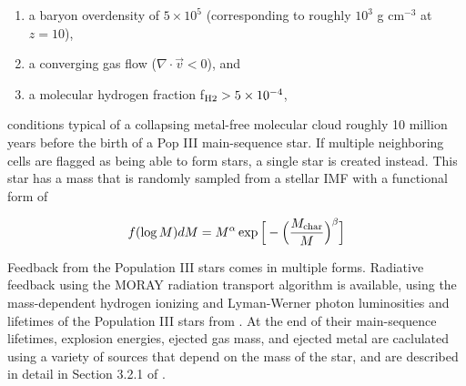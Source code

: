 \begin{enumerate}
\item a baryon overdensity of $5 \times 10^5$ (corresponding to
  roughly $10^3$ g cm$^{-3}$ at $z=10$),

\item a converging gas flow ($\nabla \cdot \vec{v} < 0$), and

\item a molecular hydrogen fraction f$_{\rm H2} > 5 \times 10^{-4}$,
\end{enumerate}

conditions typical of a collapsing metal-free molecular cloud roughly
10 million years before the birth of a Pop III main-sequence star.  If
multiple neighboring cells are flagged as being able to form stars, a
single star is created instead.  This star has a mass that is randomly
sampled from a stellar IMF with a functional form of

\begin{equation}
f(\log M) dM = M^{\alpha} \exp \Big[ -\Big( \frac{M_{\rm char}}{M}
\Big)^{\beta} \Big]
\end{equation}

Feedback from the Population III stars comes in multiple forms.
Radiative feedback using the MORAY radiation transport algorithm
\citep{Wise11_Moray} is available, using the mass-dependent hydrogen
ionizing and Lyman-Werner photon luminosities and lifetimes of the
Population III stars from \citet{2002A&A...382...28S}.  At the end of
their main-sequence lifetimes, explosion energies, ejected gas mass,
and ejected metal are caclulated using a variety of sources that
depend on the mass of the star, and are described in detail in Section
3.2.1 of \citet{2012MNRAS.427..311W}.


